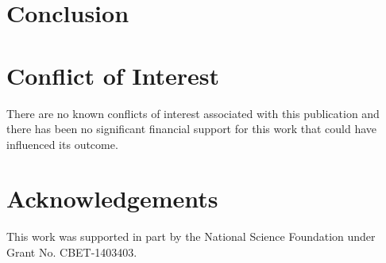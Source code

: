 \documentclass[preprint,12pt, a4paper]{elsarticle}
\begin{document}
\section{Conclusion}
\label{sec:conclusion}



\section{Conflict of Interest}
%

There are no known conflicts of interest associated with this publication and there has been no significant financial support for this work that could have influenced its outcome.

\section*{Acknowledgements}
\label{acknoledgements}

This work was supported in part by the National Science Foundation under Grant No. CBET-1403403.



\end{document}

